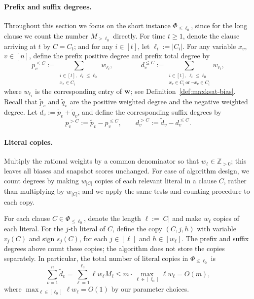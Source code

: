 \paragraph{Prefix and suffix degrees.}
Throughout this section  we focus on the short instance $\Phi_{\le \ell_0}$, since for the long clause we count the number $M_{>\ell_0}$ directly.
For time $t\ge 1$, denote the clause arriving at $t$ by $C=C_t$; and for any  $i\in [t]$, let $\ell_{i}:= |C_i|$. For any variable $x_v$,  $v\in [n]$, define the  prefix positive degree and prefix  total degree by
\[
  p_v^{\le C}
  :=\sum_{\substack{i\in[t],\ \ell_{i} \le\ell_0\\ x_v\in C_i}}w_{\ell_i },
  \qquad\qquad
  d_v^{\le C} :=\sum_{\substack{i\in[t],\ \ell_{i} \le\ell_0\\
  x_v\in C_i\ \text{or}\ \neg x_v\in C_i}}w_{\ell_i },
\]
where $w_{\ell_i}$ is the corresponding entry of $\mathbf{w}$; see Definition~\ref{def:maxksat-bias}.
Recall that $\widetilde p_v$ and $\widetilde q_v$ are the positive weighted degree and the negative weighted degree.
Let $\widetilde d_v:=\widetilde p_v+\widetilde q_v$, and define the corresponding suffix degrees by
\[
  p_v^{>C}:=\widetilde p_v-p_v^{\le C},
  \qquad
  d_v^{>C}:=\widetilde d_v-d_v^{\le C}.
\]









\paragraph{Literal copies.}
Multiply the rational weights by a common denominator so that $w_\ell\in\mathbb Z_{>0}$; this leaves all biases and snapshot scores unchanged.
For ease of  algorithm design, we count degrees by making $w_{|C|}$ copies of each relevant literal in a clause $C$, rather than multiplying by $w_{|C|}$; and we apply the same tests and counting procedure to each copy.

For each clause $C\in\Phi_{\le\ell_0}$, denote the length  $\ell:= |C|$ and  make $w_{\ell}$ copies of each literal. For the $j$-th literal of $C$,   define 
the copy $(C,j,h)$ with variable $v_j(C)$ and sign $s_j(C)$, for each  $j\in[\ell]$ and $h\in[w_{\ell } ]$.
The prefix and suffix degrees above count these copies; the algorithm does not store the copies separately.
In particular, the total number of literal copies in $\Phi_{\le\ell_0}$ is
\begin{equation}
  \sum_{v=1}^n\widetilde d_v
  =\sum_{\ell=1}^{\ell_0}\ell w_\ell M_\ell
  \le m\cdot \max_{\ell\in[\ell_0]}\ell w_\ell = O(m),
  \label{eq:weighted-total-copies}
\end{equation}
where $\max_{\ell\in[\ell_0]}\ell w_\ell = O(1)$ by our parameter choices. 


